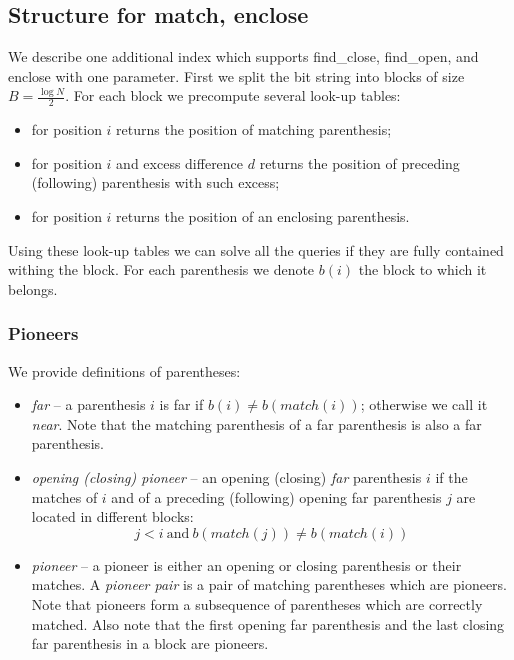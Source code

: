 \subsection{Structure for match, enclose}

We describe one additional index which supports find\_close, find\_open, and enclose with one parameter.
First we split the bit string into blocks of size $B = \frac{\log N}{2}$.
For each block we precompute several look-up tables:
\begin{itemize}
	\item for position $i$ returns the position of matching parenthesis;
	\item for position $i$ and excess difference $d$ returns the position of preceding (following) parenthesis with such excess;
	\item for position $i$ returns the position of an enclosing parenthesis.
\end{itemize}

Using these look-up tables we can solve all the queries if they are fully contained withing the block.
For each parenthesis we denote $b(i)$ the block to which it belongs.

\subsubsection{Pioneers}

We provide definitions of parentheses:
\begin{itemize}
	\item \emph{far} -- a parenthesis $i$ is far if $b(i) \ne b(match(i))$; otherwise we call it \emph{near}.
	Note that the matching parenthesis of a far parenthesis is also a far parenthesis.
	\item \emph{opening (closing) pioneer} -- an opening (closing) \emph{far} parenthesis $i$ if the matches of $i$ and of a preceding (following) opening far parenthesis $j$ are located in different blocks:
	$$j < i\ \textrm{and}\ b(match(j)) \ne b(match(i))$$
	\item \emph{pioneer} -- a pioneer is either an opening or closing parenthesis or their matches.
	A \emph{pioneer pair} is a pair of matching parentheses which are pioneers.
	Note that pioneers form a subsequence of parentheses which are correctly matched.
	Also note that the first opening far parenthesis and the last closing far parenthesis in a block are pioneers.
\end{itemize}

